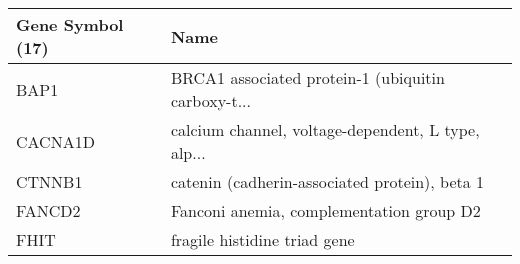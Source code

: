 \begin{tabular}{ll}
\toprule
Gene Symbol (17) &                                               Name \\
\midrule
            BAP1 & BRCA1 associated protein-1 (ubiquitin carboxy-t... \\
         CACNA1D & calcium channel, voltage-dependent, L type, alp... \\
          CTNNB1 &      catenin (cadherin-associated protein), beta 1 \\
          FANCD2 &           Fanconi anemia, complementation group D2 \\
            FHIT &                       fragile histidine triad gene \\
\bottomrule
\end{tabular}
